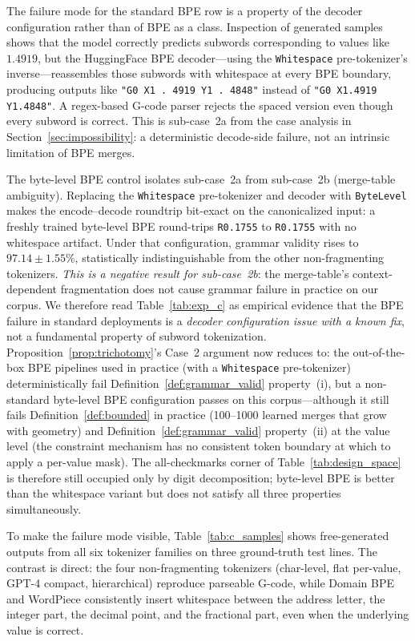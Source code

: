 \documentclass[11pt]{article}
\begin{document}
The failure mode for the standard BPE row is a property of the decoder configuration rather than of BPE as a class. Inspection of generated samples shows that the model correctly predicts subwords corresponding to values like $1.4919$, but the HuggingFace BPE decoder---using the \texttt{Whitespace} pre-tokenizer's inverse---reassembles those subwords with whitespace at every BPE boundary, producing outputs like \texttt{"G0 X1 . 4919 Y1 . 4848"} instead of \texttt{"G0 X1.4919 Y1.4848"}. A regex-based G-code parser rejects the spaced version even though every subword is correct. This is sub-case~2a from the case analysis in Section~\ref{sec:impossibility}: a deterministic decode-side failure, not an intrinsic limitation of BPE merges.

The byte-level BPE control isolates sub-case~2a from sub-case~2b (merge-table ambiguity). Replacing the \texttt{Whitespace} pre-tokenizer and decoder with \texttt{ByteLevel} makes the encode--decode roundtrip bit-exact on the canonicalized input: a freshly trained byte-level BPE round-trips \texttt{R0.1755} to \texttt{R0.1755} with no whitespace artifact. Under that configuration, grammar validity rises to $97.14 \pm 1.55\%$, statistically indistinguishable from the other non-fragmenting tokenizers. \emph{This is a negative result for sub-case~2b}: the merge-table's context-dependent fragmentation does not cause grammar failure in practice on our corpus. We therefore read Table~\ref{tab:exp_c} as empirical evidence that the BPE failure in standard deployments is a \emph{decoder configuration issue with a known fix}, not a fundamental property of subword tokenization. Proposition~\ref{prop:trichotomy}'s Case~2 argument now reduces to: the out-of-the-box BPE pipelines used in practice (with a \texttt{Whitespace} pre-tokenizer) deterministically fail Definition~\ref{def:grammar_valid} property~(i), but a non-standard byte-level BPE configuration passes on this corpus---although it still fails Definition~\ref{def:bounded} in practice (100--1000 learned merges that grow with geometry) and Definition~\ref{def:grammar_valid} property~(ii) at the value level (the constraint mechanism has no consistent token boundary at which to apply a per-value mask). The all-checkmarks corner of Table~\ref{tab:design_space} is therefore still occupied only by digit decomposition; byte-level BPE is better than the whitespace variant but does not satisfy all three properties simultaneously.

To make the failure mode visible, Table~\ref{tab:c_samples} shows free-generated outputs from all six tokenizer families on three ground-truth test lines. The contrast is direct: the four non-fragmenting tokenizers (char-level, flat per-value, GPT-4 compact, hierarchical) reproduce parseable G-code, while Domain BPE and WordPiece consistently insert whitespace between the address letter, the integer part, the decimal point, and the fractional part, even when the underlying value is correct.
\end{document}
